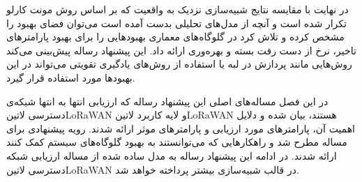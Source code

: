 
در نهایت با مقایسه نتایج شبیه‌سازی نزدیک به واقعیت که بر اساس روش مونت کارلو تکرار شده است و آنچه از مدل‌های تحلیلی بدست آمده است می‌توان
فضای بهبود را مشخص کرده و تلاش کرد در گلوگاه‌های معماری بهبودهایی را برای بهبود پارامترهای تاخیر، نرخ از دست رفت بسته و بهره‌وری ارائه داد.
این پیشنهاد رساله پیش‌بینی می‌کند روش‌هایی مانند پردازش در لبه یا استفاده از روش‌های یادگیری تقویتی می‌تواند در این بهبودها مورد استفاده قرار گیرد.


در این فصل مساله‌های اصلی این پیشنهاد رساله که ارزیابی انتها به انتها شبکه‌ی دسترسی ‌لاتین{LoRaWAN}
و لایه کاربرد ‌لاتین{LoRaWAN} هستند،
بیان شده و دلایل اهمیت آن، پارامترهای مورد ارزیابی و پارامترهای موثر ارائه شدند.
رویه پیشنهادی برای مساله مطرح شد و راهکارهایی که می‌توانستند به بهبود گلوگاه‌های سیستم کمک کنند ارائه شدند.
در ادامه این پیشنهاد رساله به مدل ساده شده از مساله ارزیابی شبکه دسترسی ‌لاتین{LoRaWAN} در قالب شبیه‌سازی بیشتر پرداخته خواهد شد.
